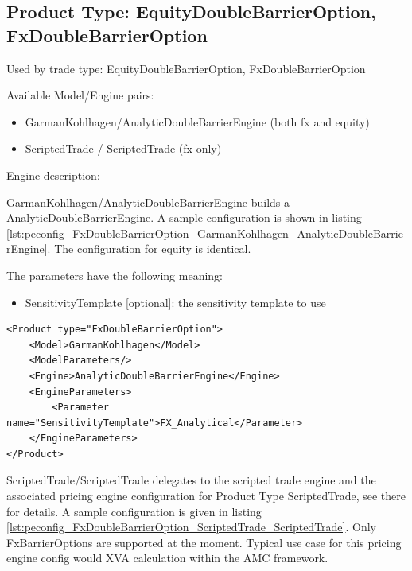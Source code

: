 \subsection{Product Type: EquityDoubleBarrierOption, FxDoubleBarrierOption}

Used by trade type: EquityDoubleBarrierOption, FxDoubleBarrierOption

Available Model/Engine pairs: 
\begin{itemize}
    \item GarmanKohlhagen/AnalyticDoubleBarrierEngine (both fx and equity)
    \item ScriptedTrade / ScriptedTrade (fx only)
\end{itemize}



Engine description:

GarmanKohlhagen/AnalyticDoubleBarrierEngine builds a AnalyticDoubleBarrierEngine. A sample configuration is shown in
listing \ref{lst:peconfig_FxDoubleBarrierOption_GarmanKohlhagen_AnalyticDoubleBarrierEngine}. The configuration for equity
is identical.

The parameters have the following meaning:

\begin{itemize}
\item SensitivityTemplate [optional]: the sensitivity template to use
\end{itemize}

\begin{longlisting}
\begin{verbatim}
<Product type="FxDoubleBarrierOption">
    <Model>GarmanKohlhagen</Model>
    <ModelParameters/>
    <Engine>AnalyticDoubleBarrierEngine</Engine>
    <EngineParameters>
        <Parameter name="SensitivityTemplate">FX_Analytical</Parameter>
    </EngineParameters>
</Product>
\end{verbatim}
\caption{Configuration for Product FxDoubleBarrierOption, Model GarmanKohlhagen, Engine AnalyticDoubleBarrierBinaryEngine}
\label{lst:peconfig_FxDoubleBarrierOption_GarmanKohlhagen_AnalyticDoubleBarrierEngine}
\end{longlisting}

ScriptedTrade/ScriptedTrade delegates to the scripted trade engine and the associated pricing engine configuration for
Product Type ScriptedTrade, see there for details. A sample configuration is given in listing
\ref{lst:peconfig_FxDoubleBarrierOption_ScriptedTrade_ScriptedTrade}. Only FxBarrierOptions are supported at the moment.
Typical use case for this pricing engine config would XVA calculation within the AMC framework.

